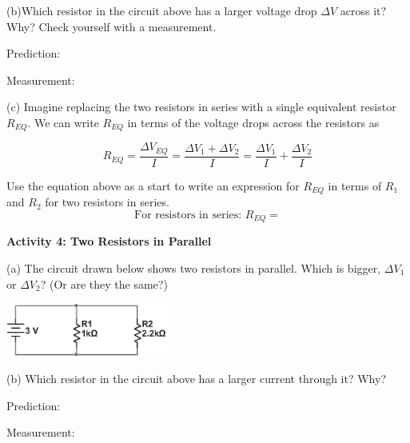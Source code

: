 (b)Which resistor in the circuit above has a larger voltage drop $\Delta V$ across it?   Why?  Check yourself with a measurement.  

\vspace{0.2 in}
\hspace{0.4 in} Prediction:
\vspace{0.2 in}

\hspace{0.4 in} Measurement:  
\vspace{0.2 in}

(c) Imagine replacing the two resistors in series with a single equivalent resistor $R_{EQ}$.  We can write $R_{EQ}$ in terms of the voltage drops across the resistors as

\begin{displaymath}
R_{EQ} = \frac{\Delta V_{EQ}}{I}= \frac{\Delta V_1 +\Delta V_2 }{I}=\frac{\Delta V_1}{I} + \frac{\Delta V_2}{I}
\end{displaymath}

Use the equation above as a start to write an expression for $R_{EQ}$ in terms of $R_1$ and $R_2$ for two resistors in series.
\begin{displaymath}
\textrm{For resistors in series: } R_{EQ} = 
\end{displaymath}

\textbf{Activity 4: Two Resistors in Parallel} \par
\nopagebreak
(a)  The circuit drawn below shows two resistors in parallel.  Which is bigger, $\Delta V_1$ or $\Delta V_2$? (Or are they the same?)

\hspace{0.5 in}\includegraphics[width=0.4\textwidth]{electric_circuits2/circ_diag5_bw.eps}
\vspace{0.2 in}

\pagebreak
(b) Which resistor in the circuit above has a larger current through it?   Why? 
 
\vspace{0.2 in}
\hspace{0.4 in} Prediction:
\vspace{0.2 in}

\hspace{0.4 in} Measurement:  
\vspace{0.2 in}

